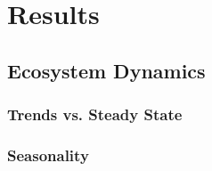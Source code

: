 \chapter{Results}
\label{chap:res}

\section{Ecosystem Dynamics}
\label{chap:res:dyn}

\subsection{Trends vs. Steady State}
\label{chap:res:dyn:trend}

\subsection{Seasonality}
\label{chap:res:dyn:seas}